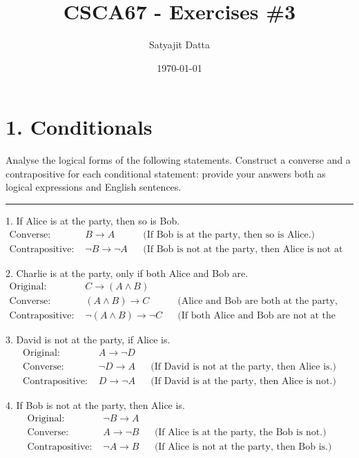 \documentclass[]{article}
\title{\textbf{CSCA67 - Exercises \#3}}
\author{ Satyajit Datta }
\date{\today}
\begin{document}
\maketitle    

\section*{1. Conditionals}

Analyse the logical forms of the following statements. Construct a converse and a contrapositive for
each conditional statement: provide your answers both as logical expressions and English sentences.
\hrule
\vspace{0.1in}
1. If Alice is at the party, then so is Bob.
\begin{align*}
    \text{Converse: } & B \rightarrow A 
        && \text{(If Bob is at the party, then so is Alice.)} \\
    \text{Contrapositive: } & \neg B \rightarrow \neg A 
        && \text{(If Bob is not at the party, then Alice is not at the party.)}
\end{align*}

2. Charlie is at the party, only if both Alice and Bob are.
\begin{align*}
    \text{Original: } & C \rightarrow (A \land B) \\
    \text{Converse: } & (A \land B) \rightarrow C 
        && \text{(Alice and Bob are both at the party, only if Charlie is.)} \\
    \text{Contrapositive: } & \neg (A \land B) \rightarrow \neg C 
        && \text{(If both Alice and Bob are not at the party, then Charlie is not at the party.)}
\end{align*}

3. David is not at the party, if Alice is.
\begin{align*}
    \text{Original: } & A \rightarrow \neg D \\
    \text{Converse: } & \neg D \rightarrow A
        && \text{(If David is not at the party, then Alice is.)} \\
    \text{Contrapositive: } & D \rightarrow \neg A
        && \text{(If David is at the party, then Alice is not.)}
\end{align*}

4. If Bob is not at the party, then Alice is.
\begin{align*}
    \text{Original: } & \neg B \rightarrow A \\
    \text{Converse: } & A \rightarrow \neg B
        && \text{(If Alice is at the party, the Bob is not.)} \\
    \text{Contrapositive: } & \neg A \rightarrow B
        && \text{(If Alice is not at the party, then Bob is.)}
\end{align*}
\end{document}
